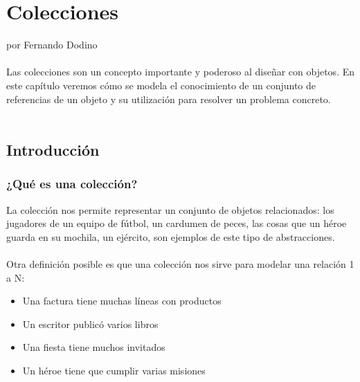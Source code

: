 \documentclass[a4paper,12pt]{book}
\begin{document}
\chapter{Colecciones}
por Fernando Dodino
\\
\\
Las colecciones son un concepto importante y poderoso al diseñar con objetos. En este capítulo veremos cómo
se modela el conocimiento de un conjunto de referencias de un objeto y su utilización para resolver un problema
concreto.
\\
\\

\tableofcontents

\section{Introducción}

\subsection{¿Qué es una colección?}
La colección nos permite representar un conjunto de objetos relacionados: los jugadores de un equipo de fútbol, 
un cardumen de peces, las cosas que un héroe guarda en su mochila, un ejército, son ejemplos de este
tipo de abstracciones.\\
\\
Otra definición posible es que una colección nos sirve para modelar una relación 1 a N:\\
\begin{itemize}
\item Una factura tiene muchas líneas con productos
\item Un escritor publicó varios libros
\item Una fiesta tiene muchos invitados
\item Un héroe tiene que cumplir varias misiones
\end{itemize}
\end{document}
